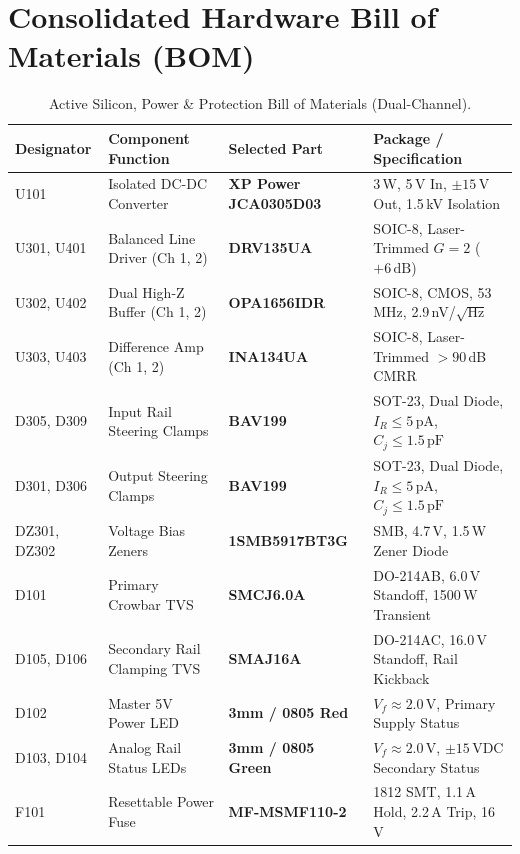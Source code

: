 \documentclass[11pt, letterpaper]{article}
\begin{document}
\clearpage

\section{Consolidated Hardware Bill of Materials (BOM)}

\begin{table}[H]
    \centering
    \small
    \setlength{\tabcolsep}{3.5pt}
    \begin{tabularx}{\linewidth}{@{} l l l L @{}}
        \toprule
        \textbf{Designator} & \textbf{Component Function} & \textbf{Selected Part} & \textbf{Package / Specification} \\
        \midrule
        U101 & Isolated DC-DC Converter & \textbf{XP Power JCA0305D03} & 3\,W, 5\,V In, $\pm 15$\,V Out, 1.5\,kV Isolation \\
        U301, U401 & Balanced Line Driver (Ch 1, 2) & \textbf{DRV135UA} & SOIC-8, Laser-Trimmed $G=2$ ($+6\,\text{dB}$) \\
        U302, U402 & Dual High-Z Buffer (Ch 1, 2) & \textbf{OPA1656IDR} & SOIC-8, CMOS, 53\,MHz, 2.9\,nV/$\sqrt{\text{Hz}}$ \\
        U303, U403 & Difference Amp (Ch 1, 2) & \textbf{INA134UA} & SOIC-8, Laser-Trimmed $>90$\,dB CMRR \\
        D305, D309 & Input Rail Steering Clamps & \textbf{BAV199} & SOT-23, Dual Diode, $I_R \le 5\,\text{pA}$, $C_j \le 1.5\,\text{pF}$ \\
        D301, D306 & Output Steering Clamps & \textbf{BAV199} & SOT-23, Dual Diode, $I_R \le 5\,\text{pA}$, $C_j \le 1.5\,\text{pF}$ \\
        DZ301, DZ302 & Voltage Bias Zeners & \textbf{1SMB5917BT3G} & SMB, 4.7\,V, 1.5\,W Zener Diode \\
        D101 & Primary Crowbar TVS & \textbf{SMCJ6.0A} & DO-214AB, 6.0\,V Standoff, 1500\,W Transient \\
        D105, D106 & Secondary Rail Clamping TVS & \textbf{SMAJ16A} & DO-214AC, 16.0\,V Standoff, Rail Kickback \\
        D102 & Master 5V Power LED & \textbf{3mm / 0805 Red} & $V_f \approx 2.0\,\text{V}$, Primary Supply Status \\
        D103, D104 & Analog Rail Status LEDs & \textbf{3mm / 0805 Green} & $V_f \approx 2.0\,\text{V}$, $\pm 15\,\text{VDC}$ Secondary Status \\
        F101 & Resettable Power Fuse & \textbf{MF-MSMF110-2} & 1812 SMT, 1.1\,A Hold, 2.2\,A Trip, 16\,V \\
        \bottomrule
    \end{tabularx}
    \caption{Active Silicon, Power \& Protection Bill of Materials (Dual-Channel).}
    \label{tab:bom_active}
\end{table}
\end{document}
